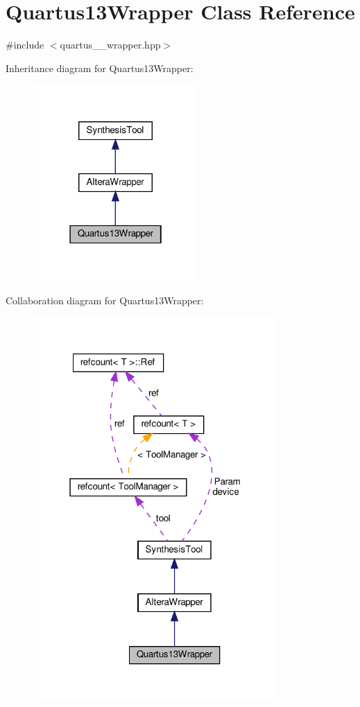 \hypertarget{classQuartus13Wrapper}{}\section{Quartus13\+Wrapper Class Reference}
\label{classQuartus13Wrapper}


{\ttfamily \#include $<$quartus\+\_\+\_\+wrapper.\+hpp$>$}



Inheritance diagram for Quartus13\+Wrapper\+:
\nopagebreak
\begin{figure}[H]
\begin{center}
\leavevmode
\includegraphics[width=178pt]{df/d2f/classQuartus13Wrapper__inherit__graph}
\end{center}
\end{figure}


Collaboration diagram for Quartus13\+Wrapper\+:
\nopagebreak
\begin{figure}[H]
\begin{center}
\leavevmode
\includegraphics[width=265pt]{dd/db9/classQuartus13Wrapper__coll__graph}
\end{center}
\end{figure}
